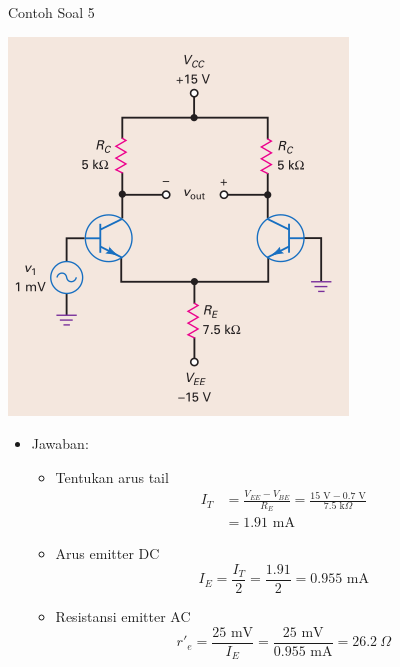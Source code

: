 \documentclass[aspectratio=169]{beamer}
\begin{document}
\begin{frame}{Contoh Soal 5}
	\begin{multicols}{2}
		\begin{center}
			\includegraphics[height=0.7\textheight]{gambar/01.diff-amp/01.contoh_soal_1-2}
		\end{center}
		\columnbreak
		\begin{itemize}
			\item Jawaban:
			\begin{itemize}
				\item Tentukan arus tail
				\begin{align*}
					I_T &= \frac{V_{EE} - V_{BE}}{R_E} = \frac{15 \text{ V} - 0.7 \text{ V}}{7.5 \text{ k}\Omega} \\
					&= 1.91 \text{ mA}
				\end{align*}
				\item Arus emitter DC
				\[ I_E = \frac{I_T}{2} = \frac{1.91}{2} = 0.955 \text{ mA}\]
				\item Resistansi emitter AC
				\[ r'_e = \frac{25 \text{ mV}}{ I_E} =\frac{25 \text{ mV}}{0.955 \text{ mA}} = 26.2~\Omega \]
			\end{itemize}
		\end{itemize}
	\end{multicols}
\end{frame}
\end{document}
